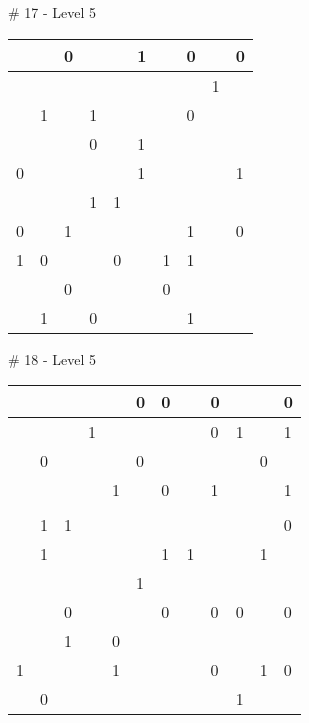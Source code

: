 \medskip

\# 17 - Level 5 \newline
\begin{tabular}{|m{\collen}|m{\collen}|m{\collen}|m{\collen}|m{\collen}|m{\collen}|m{\collen}|m{\collen}|m{\collen}|m{\collen}|}
\hline
    &   & 0 &   &   & 1 &   & 0 &   & 0 \\
\hline
    &   &   &   &   &   &   &   & 1 &   \\
\hline
    & 1 &   & 1 &   &   &   & 0 &   &   \\
\hline
    &   &   & 0 &   & 1 &   &   &   &   \\
\hline
  0 &   &   &   &   & 1 &   &   &   & 1 \\
\hline
    &   &   & 1 & 1 &   &   &   &   &   \\
\hline
  0 &   & 1 &   &   &   &   & 1 &   & 0 \\
\hline
  1 & 0 &   &   & 0 &   & 1 & 1 &   &   \\
\hline
    &   & 0 &   &   &   & 0 &   &   &   \\
\hline
    & 1 &   & 0 &   &   &   & 1 &   &   \\
\hline
\end{tabular}


\medskip

\# 18 - Level 5 \newline
\begin{tabular}{|m{\collen}|m{\collen}|m{\collen}|m{\collen}|m{\collen}|m{\collen}|m{\collen}|m{\collen}|m{\collen}|m{\collen}|m{\collen}|m{\collen}|}
\hline
    &   &   &   &   & 0 & 0 &   & 0 &   &   & 0 \\
\hline
    &   &   & 1 &   &   &   &   & 0 & 1 &   & 1 \\
\hline
    & 0 &   &   &   & 0 &   &   &   &   & 0 &   \\
\hline
    &   &   &   & 1 &   & 0 &   & 1 &   &   & 1 \\
\hline
    &   &   &   &   &   &   &   &   &   &   &   \\
\hline
    & 1 & 1 &   &   &   &   &   &   &   &   & 0 \\
\hline
    & 1 &   &   &   &   & 1 & 1 &   &   & 1 &   \\
\hline
    &   &   &   &   & 1 &   &   &   &   &   &   \\
\hline
    &   & 0 &   &   &   & 0 &   & 0 & 0 &   & 0 \\
\hline
    &   & 1 &   & 0 &   &   &   &   &   &   &   \\
\hline
  1 &   &   &   & 1 &   &   &   & 0 &   & 1 & 0 \\
\hline
    & 0 &   &   &   &   &   &   &   & 1 &   &   \\
\hline
\end{tabular}


